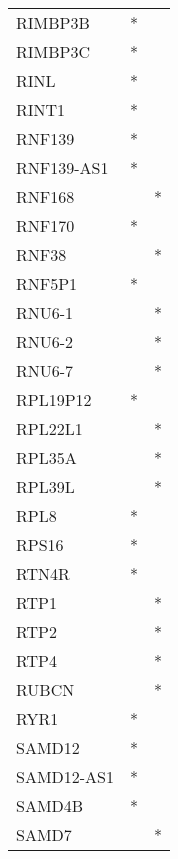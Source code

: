 \begin{longtable}{lcc}
RIMBP3B          &              * &            \\
RIMBP3C          &              * &            \\
RINL             &              * &            \\
RINT1            &              * &            \\
RNF139           &              * &            \\
RNF139-AS1       &              * &            \\
RNF168           &                &          * \\
RNF170           &              * &            \\
RNF38            &                &          * \\
RNF5P1           &              * &            \\
RNU6-1           &                &          * \\
RNU6-2           &                &          * \\
RNU6-7           &                &          * \\
RPL19P12         &              * &            \\
RPL22L1          &                &          * \\
RPL35A           &                &          * \\
RPL39L           &                &          * \\
RPL8             &              * &            \\
RPS16            &              * &            \\
RTN4R            &              * &            \\
RTP1             &                &          * \\
RTP2             &                &          * \\
RTP4             &                &          * \\
RUBCN            &                &          * \\
RYR1             &              * &            \\
SAMD12           &              * &            \\
SAMD12-AS1       &              * &            \\
SAMD4B           &              * &            \\
SAMD7            &                &          * \\

\end{longtable}
